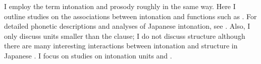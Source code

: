 I employ the term intonation and prosody roughly in the same way. Here I outline studies on the associations between intonation and functions such as .
For detailed phonetic descriptions and analyses of Japanese intonation,
see . %
Also, I only discuss units smaller than the clause;
I do not discuss  structure
although there are many interesting interactions between intonation and  structure in Japanese \cite[e.g.,][]{nakajimaallen93,vendittiswerts96,muraiyamashita99,koisoetal03,okuboetal03,koisoishimoto12}.
I focus on 
studies on intonation units and .

